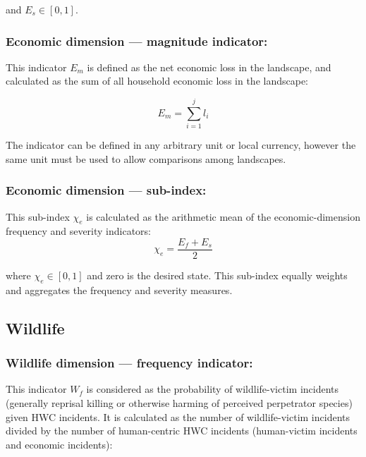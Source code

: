 \documentclass[fleqn,10pt]{olplainarticle}
\begin{document}
and $E_s \in [0,1]$.\\

\subsubsection*{Economic dimension --- magnitude indicator:}

This indicator $E_m$ is defined as the net economic loss in the landscape, and calculated as the sum of all household economic loss in the landscape:

\begin{equation*}
    E_m = \sum_{i=1}^{j}l_i
\end{equation*}

The indicator can be defined in any arbitrary unit or local currency, however the same unit must be used to allow comparisons among landscapes.\\

\subsubsection*{Economic dimension --- sub-index:}

This sub-index $\chi_e$ is calculated as the arithmetic mean of  the economic-dimension frequency and severity indicators:
\begin{equation*}
    \chi_e = \frac{E_f + E_s}{2}
\end{equation*}

where $\chi_e \in [0,1]$ and zero is the desired state. This sub-index equally weights and aggregates the frequency and severity measures.\\

\subsection*{Wildlife}

\subsubsection*{Wildlife dimension --- frequency indicator:}

This indicator $W_f$ is considered as the probability of wildlife-victim incidents (generally reprisal killing or otherwise harming of perceived perpetrator species) given HWC incidents. It is calculated as the number of wildlife-victim incidents divided by the number of human-centric HWC incidents (human-victim incidents and economic incidents):
\end{document}
